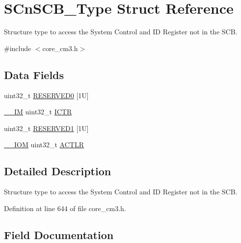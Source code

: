 \hypertarget{struct_s_cn_s_c_b___type}{}\section{S\+Cn\+S\+C\+B\+\_\+\+Type Struct Reference}
\label{struct_s_cn_s_c_b___type}


Structure type to access the System Control and ID Register not in the S\+CB.  




{\ttfamily \#include $<$core\+\_\+cm3.\+h$>$}

\subsection*{Data Fields}
\begin{DoxyCompactItemize}
\item 
uint32\+\_\+t \hyperlink{struct_s_cn_s_c_b___type_affae06cd6df5e9fe9a92994052fd3bec}{R\+E\+S\+E\+R\+V\+E\+D0} \mbox{[}1\+U\mbox{]}
\item 
\hyperlink{core__sc300_8h_a4cc1649793116d7c2d8afce7a4ffce43}{\+\_\+\+\_\+\+IM} uint32\+\_\+t \hyperlink{struct_s_cn_s_c_b___type_acf9b76331abd768af25a10b3625da4b4}{I\+C\+TR}
\item 
uint32\+\_\+t \hyperlink{struct_s_cn_s_c_b___type_aaa45b15c650670f4f84000a1f419ca00}{R\+E\+S\+E\+R\+V\+E\+D1} \mbox{[}1\+U\mbox{]}
\item 
\hyperlink{core__sc300_8h_ab6caba5853a60a17e8e04499b52bf691}{\+\_\+\+\_\+\+I\+OM} uint32\+\_\+t \hyperlink{struct_s_cn_s_c_b___type_afabed911b9f91f9df848999e1b5d6504}{A\+C\+T\+LR}
\end{DoxyCompactItemize}


\subsection{Detailed Description}
Structure type to access the System Control and ID Register not in the S\+CB. 

Definition at line 644 of file core\+\_\+cm3.\+h.



\subsection{Field Documentation}
